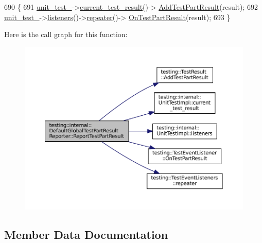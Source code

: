 \begin{DoxyCode}
690                                   \{
691   \hyperlink{classtesting_1_1internal_1_1DefaultGlobalTestPartResultReporter_a9cf6282b104ca45d1abae6940708e0bb}{unit\_test\_}->\hyperlink{classtesting_1_1internal_1_1UnitTestImpl_aba3caef4ad23ce98be80250aeb0cc787}{current\_test\_result}()->
      \hyperlink{classtesting_1_1TestResult_ac28e9821ad3e9314c4fe41b119c5b44d}{AddTestPartResult}(result);
692   \hyperlink{classtesting_1_1internal_1_1DefaultGlobalTestPartResultReporter_a9cf6282b104ca45d1abae6940708e0bb}{unit\_test\_}->\hyperlink{classtesting_1_1internal_1_1UnitTestImpl_a67211f8475936f88d0e4d30f841c0da4}{listeners}()->\hyperlink{classtesting_1_1TestEventListeners_ad28af964081553de465fbfc1c5a46650}{repeater}()->
      \hyperlink{classtesting_1_1TestEventListener_a054f8705c883fa120b91473aff38f2ee}{OnTestPartResult}(result);
693 \}
\end{DoxyCode}
Here is the call graph for this function\+:
\nopagebreak
\begin{figure}[H]
\begin{center}
\leavevmode
\includegraphics[width=350pt]{classtesting_1_1internal_1_1DefaultGlobalTestPartResultReporter_a6081576a23b964cfecab1e424d8044fc_cgraph}
\end{center}
\end{figure}


\subsection{Member Data Documentation}
\mbox{\label{classtesting_1_1internal_1_1DefaultGlobalTestPartResultReporter_a9cf6282b104ca45d1abae6940708e0bb}} 
